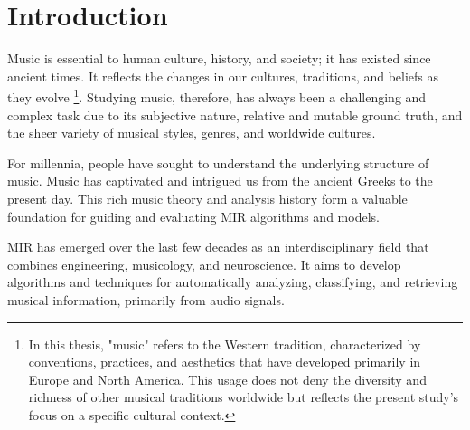 \chapter{Introduction}

Music is essential to human culture, history, and society; it has existed since ancient times. It reflects the changes in our cultures, traditions, and beliefs as they evolve \footnote{In this thesis, "music" refers to the Western tradition, characterized by conventions, practices, and aesthetics that have developed primarily in Europe and North America. This usage does not deny the diversity and richness of other musical traditions worldwide but reflects the present study's focus on a specific cultural context.}. Studying music, therefore, has always been a challenging and complex task due to its subjective nature, relative and mutable ground truth, and the sheer variety of musical styles, genres, and worldwide cultures.

For millennia, people have sought to understand the underlying structure of music. Music has captivated and intrigued us from the ancient Greeks to the present day. This rich music theory and analysis history form a valuable foundation for guiding and evaluating MIR algorithms and models.

MIR has emerged over the last few decades as an interdisciplinary field that combines engineering, musicology, and neuroscience. It aims to develop algorithms and techniques for automatically analyzing, classifying, and retrieving musical information, primarily from audio signals. 